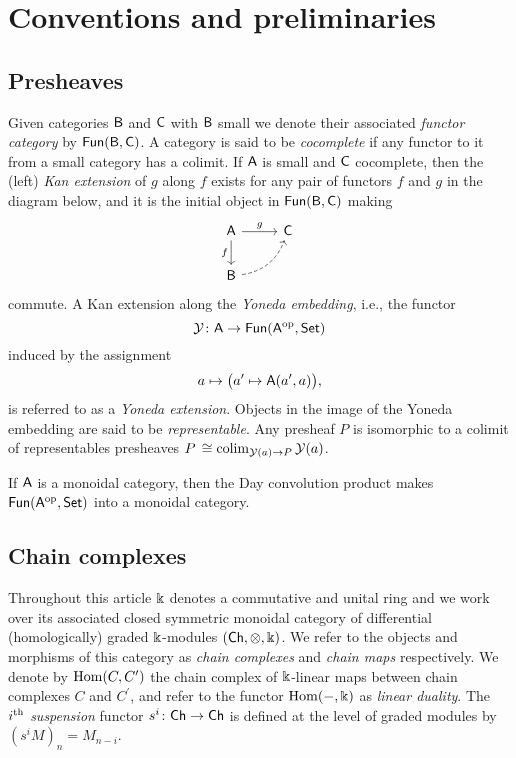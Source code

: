 
\section{Conventions and preliminaries}\label{s:preliminaries}

\subsection{Presheaves}\label{ss:category theory}

Given categories $\mathsf{B}$ and $\mathsf{C}$ with $\mathsf{B}$ small we denote their associated \textit{functor category} by $\mathsf{Fun}(\mathsf{B}, \mathsf{C})$.
A category is said to be \textit{cocomplete} if any functor to it from a small category has a colimit.
If $\mathsf{A}$ is small and $\mathsf{C}$ cocomplete, then the (left) \textit{Kan extension} of $g$ along $f$ exists for any pair of functors $f$ and $g$ in the diagram below, and it is the initial object in $\mathsf{Fun}(\mathsf{B}, \mathsf{C})$ making
\begin{equation*}
	\begin{tikzcd}[column sep=normal, row sep=normal]
		\sA \arrow[d, "f"'] \arrow[r, "g"] & \sC \\
		\sB \arrow[dashed, ur, bend right] & \quad
	\end{tikzcd}
\end{equation*}
commute.
A Kan extension along the \textit{Yoneda embedding}, i.e., the functor
\[
\operatorname{\mathcal{Y}} \colon \mathsf{A} \to \mathsf{Fun}(\mathsf{A}^{\mathrm{op}}, \mathsf{Set})
\]
induced by the assignment
\[
a \mapsto \big(a^\prime \mapsto \mathsf{A}(a^\prime, a)\big),
\]
is referred to as a \textit{Yoneda extension}.
Objects in the image of the Yoneda embedding are said to be \textit{representable}.
Any presheaf $P$ is isomorphic to a colimit of representables presheaves $P \, \cong \operatorname*{colim}_{\operatorname{\mathcal{Y}}(a) \to P} \operatorname{\mathcal{Y}}(a)$.

If $\mathsf{A}$ is a monoidal category, then the Day convolution product makes $\mathsf{Fun}(\mathsf{A}^{\mathrm{op}}, \mathsf{Set})$ into a monoidal category.

\subsection{Chain complexes}

Throughout this article $\Bbbk$ denotes a commutative and unital ring and we work over its associated closed symmetric monoidal category of differential (homologically) graded $\Bbbk$-modules $(\mathsf{Ch}, \otimes, \Bbbk)$.
We refer to the objects and morphisms of this category as \textit{chain complexes} and \textit{chain maps} respectively.
We denote by $\mathrm{Hom}(C, C^\prime)$ the chain complex of $\Bbbk$-linear maps between chain complexes $C$ and $C^\prime$, and refer to the functor $\mathrm{Hom}(-, \Bbbk)$ as \textit{linear duality}.
The $i^{\mathrm{th}}$ \textit{suspension} functor $s^i \colon \mathsf{Ch} \to \mathsf{Ch}$ is defined at the level of graded modules by $(s^{i}M)_n = M_{n-i}$.

